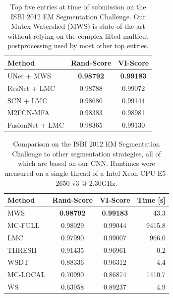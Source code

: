 \begin{table}[t]
    \centering
        \begin{tabular}{l c c}
            \toprule
            Method                                  & \hspace{-0.5cm}Rand-Score & VI-Score \\        
            \midrule
            UNet + MWS                              & \textbf{0.98792} & \textbf{0.99183}\\        
            ResNet + LMC \cite{xiao2018deep}        & 0.98788   &  0.99072\\
            SCN + LMC \cite{weiler2017learning}     & 0.98680   &  0.99144\\
            M2FCN-MFA \cite{shen2017multi}         & 0.98383   &  0.98981\\
            FusionNet + LMC \cite{quan2016fusionnet}& 0.98365   &  0.99130\\ 
        \end{tabular}
        \caption[Results on ISBI 2012 EM Segmentation Challenge]{Top five entries at time of submission on the ISBI 2012 EM Segmentation Challenge. Our Mutex Watershed (MWS) is state-of-the-art without relying on the complex lifted multicut postprocessing used by most other top entries.}
        \label{tab:isbi-leaderboard}
\end{table}
\begin{table}[t]
    \centering
        \begin{tabular}{l c c r}
            \toprule
            Method   & \hspace{-0.5cm}Rand-Score & VI-Score & Time [s] \\        
            \midrule
            MWS      & \textbf{0.98792} & \textbf{0.99183} & 43.3 \\        
            MC-FULL  & 0.98029   & 0.99044 & 9415.8 \\
            LMC      & 0.97990   & 0.99007 &  966.0 \\
            THRESH   & 0.91435   & 0.96961 & 0.2 \\
            WSDT     & 0.88336   & 0.96312 & 4.4 \\
            MC-LOCAL & 0.70990   & 0.86874 & 1410.7 \\
            WS       & 0.63958   & 0.89237 & 4.9 \\
        \end{tabular}
        \caption[Different segmentation strategies on ISBI 2012 EM Segmentation Challenge]{Comparison on the ISBI 2012 EM Segmentation Challenge to other segmentation strategies, all of which are based on our CNN. Runtimes were measured on a single thread of a Intel Xeon CPU E5-2650 v3 @ 2.30GHz.}
        \label{tab:isbi-baselines}
\end{table}

